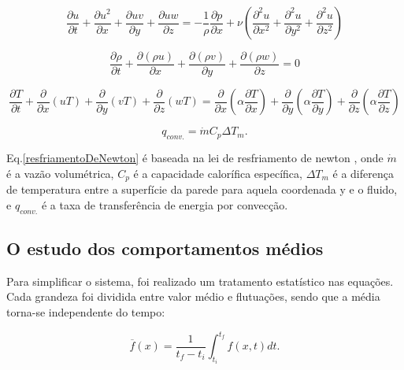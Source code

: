 \begin{equation}
  \frac{\partial u}{\partial t} + \frac{\partial u^2}{\partial x} + \frac{\partial uv}{\partial y} + \frac{\partial uw}{\partial z} = - \frac{1}{\rho} \frac{\partial {p}}{\partial x} + \nu \left( \frac{\partial^2 u}{\partial x^2} + \frac{\partial^2 u}{\partial y^2} + \frac{\partial^2 u}{\partial z^2}   \right)
\end{equation}

\begin{equation}
  \frac{\partial \rho}{\partial t} +  \frac{\partial (\rho u)}{\partial x} + \frac{\partial (\rho v)}{\partial y} + \frac{\partial (\rho w)}{\partial z} = 0
\end{equation}

\begin{equation}
  \frac{\partial T}{\partial t} + {\frac{\partial{}}{\partial{x}} (uT)} + {\frac{\partial{}}{\partial{y}} (vT)} + {\frac{\partial{}}{\partial{z}} (wT)}
  =
  {\frac{\partial{}}{\partial{x}}} \left(\alpha {\frac{\partial{T}}{\partial{x}}} \right) +
  {\frac{\partial{}}{\partial{y}}} \left(\alpha {\frac{\partial{T}}{\partial{y}}} \right) +
  {\frac{\partial{}}{\partial{z}}} \left(\alpha {\frac{\partial{T}}{\partial{z}}} \right)
\end{equation}

\begin{equation}\label{resfriamentoDeNewton}
  q_{conv.} = \dot{m} C_p \Delta T_m.
\end{equation}

Eq.\ref{resfriamentoDeNewton} é baseada na lei de resfriamento de newton \cite{Incropera}, onde $\dot{m}$ é a vazão volumétrica, $C_p$ é a capacidade calorífica específica, $\Delta T_m$ é a diferença de temperatura entre a superfície da parede para aquela coordenada y e o fluido, e $q_{conv.}$ é a taxa de transferência de energia por convecção.

\subsection{O estudo dos comportamentos médios}
Para simplificar o sistema, foi realizado um tratamento estatístico nas equações. Cada grandeza foi dividida entre valor médio e flutuações, sendo que a média torna-se independente do tempo:

\begin{equation}
  \overline{f}({x})=\frac{1}{t_f - t_i} \int_{t_i}^{t_f} f({x} , t) dt.
\end{equation}

